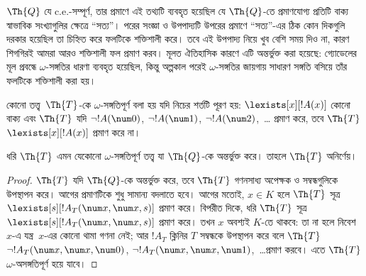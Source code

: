 \documentclass[../../../include/open-logic-section]{subfiles}
\begin{document}


\begin{explain}
$\Th{Q}$ যে c.e.-সম্পূর্ণ, তার প্রমাণে এই তথ্যটি ব্যবহৃত হয়েছিল যে
$\Th{Q}$-তে প্রমাণযোগ্য প্রতিটি বাক্য স্বাভাবিক সংখ্যাগুলির ক্ষেত্রে
``সত্য''। পরের সংজ্ঞা ও উপপাদ্যটি উপরের প্রমাণে ``সত্য''-এর ঠিক কোন
দিকগুলি দরকার হয়েছিল তা চিহ্নিত করে ফলটিকে শক্তিশালী করে। তবে এই উপপাদ্য
নিয়ে খুব বেশি সময় দিও না, কারণ শিগগিরই আমরা আরও শক্তিশালী ফল প্রমাণ করব।
মূলত ঐতিহাসিক কারণে এটি অন্তর্ভুক্ত করা হয়েছে: গ্যোডেলের মূল প্রবন্ধে
$\omega$-সঙ্গতির ধারণা ব্যবহৃত হয়েছিল, কিন্তু অল্পকাল পরেই
$\omega$-সঙ্গতির জায়গায় সাধারণ সঙ্গতি বসিয়ে তাঁর ফলটিকে শক্তিশালী করা হয়।
\end{explain}

\begin{defn}
কোনো তত্ত্ব~$\Th{T}$-কে $\omega$-সঙ্গতিপূর্ণ বলা হয় যদি নিচের শর্তটি
পূরণ হয়: $\lexists[x][!A(x)]$ কোনো বাক্য এবং $\Th{T}$ যদি
$\lnot !A(\num 0)$, $\lnot !A(\num 1)$, $\lnot !A(\num 2)$,~\dots
প্রমাণ করে, তবে $\Th{T}$ $\lexists[x][!A(x)]$ প্রমাণ করে না।
\end{defn}

\begin{thm}
  ধরি $\Th{T}$ এমন যেকোনো $\omega$-সঙ্গতিপূর্ণ তত্ত্ব যা $\Th{Q}$-কে
  অন্তর্ভুক্ত করে। তাহলে $\Th{T}$ অনির্ণেয়।
\end{thm}

\begin{proof}
$\Th{T}$ যদি $\Th{Q}$-কে অন্তর্ভুক্ত করে, তবে $\Th{T}$ গণনসাধ্য অপেক্ষক
ও সম্বন্ধগুলিকে উপস্থাপন করে। আগের প্রমাণটিকে শুধু সামান্য বদলাতে হবে। আগের
মতোই, $x \in K$ হলে $\Th{T}$ সূত্র
$\lexists[s][!A_T(\num x,\num x,s)]$ প্রমাণ করে। বিপরীত দিকে, ধরি
$\Th{T}$ সূত্র $\lexists[s][!A_T(\num x, \num x, s)]$ প্রমাণ করে। তখন
$x$ অবশ্যই $K$-তে থাকবে: তা না হলে নিবেশ~$x$-এ যন্ত্র~$x$-এর কোনো থামা
গণনা নেই; আর $!A_T$ ক্লিনির $T$ সম্বন্ধকে উপস্থাপন করে বলে $\Th{T}$
$\lnot !A_T(\num x, \num x, \num 0)$,
$\lnot !A_T(\num x, \num x, \num 1)$,~\dots প্রমাণ করবে। এতে
$\Th{T}$ $\omega$-অসঙ্গতিপূর্ণ হয়ে যাবে।
\end{proof}
\end{document}
